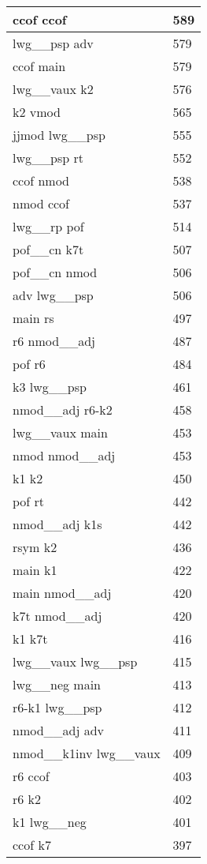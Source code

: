 \documentclass[a4 paper]{article}
\begin{document}
\begin{longtable}{p{}p{}}
ccof ccof  & 589 \\ \midrule
lwg\_\_psp adv  & 579 \\ \midrule
ccof main  & 579 \\ \midrule
lwg\_\_vaux k2  & 576 \\ \midrule
k2 vmod  & 565 \\ \midrule
jjmod lwg\_\_psp  & 555 \\ \midrule
lwg\_\_psp rt  & 552 \\ \midrule
ccof nmod  & 538 \\ \midrule
nmod ccof  & 537 \\ \midrule
lwg\_\_rp pof  & 514 \\ \midrule
pof\_\_cn k7t  & 507 \\ \midrule
pof\_\_cn nmod  & 506 \\ \midrule
adv lwg\_\_psp  & 506 \\ \midrule
main rs  & 497 \\ \midrule
r6 nmod\_\_adj  & 487 \\ \midrule
pof r6  & 484 \\ \midrule
k3 lwg\_\_psp  & 461 \\ \midrule
nmod\_\_adj r6-k2  & 458 \\ \midrule
lwg\_\_vaux main  & 453 \\ \midrule
nmod nmod\_\_adj  & 453 \\ \midrule
k1 k2  & 450 \\ \midrule
pof rt  & 442 \\ \midrule
nmod\_\_adj k1s  & 442 \\ \midrule
rsym k2  & 436 \\ \midrule
main k1  & 422 \\ \midrule
main nmod\_\_adj  & 420 \\ \midrule
k7t nmod\_\_adj  & 420 \\ \midrule
k1 k7t  & 416 \\ \midrule
lwg\_\_vaux lwg\_\_psp  & 415 \\ \midrule
lwg\_\_neg main  & 413 \\ \midrule
r6-k1 lwg\_\_psp  & 412 \\ \midrule
nmod\_\_adj adv  & 411 \\ \midrule
nmod\_\_k1inv lwg\_\_vaux  & 409 \\ \midrule
r6 ccof  & 403 \\ \midrule
r6 k2  & 402 \\ \midrule
k1 lwg\_\_neg  & 401 \\ \midrule
ccof k7  & 397 \\ \midrule

\end{longtable}
\end{document}
